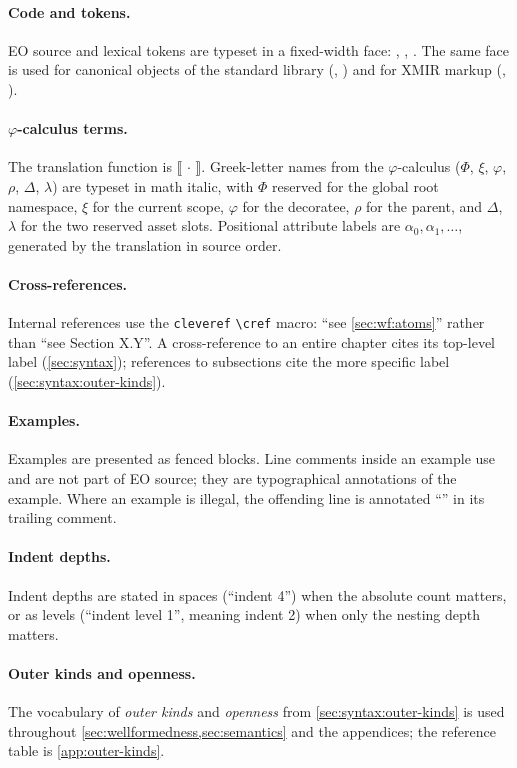 \paragraph{Code and tokens.}
EO source and lexical tokens are typeset in a fixed-width face:
  , , .
The same face is used for canonical objects of the standard library
  (, ) and for XMIR markup
  (, ).

\paragraph{\texorpdfstring{\(\varphi\)-calculus}{phi-calculus} terms.}
The translation function is \(\llbracket\,\cdot\,\rrbracket\).
Greek-letter names from the \(\varphi\)-calculus
  (\(\Phi\), \(\xi\), \(\varphi\), \(\rho\), \(\Delta\), \(\lambda\))
  are typeset in math italic, with \(\Phi\) reserved for the global
  root namespace, \(\xi\) for the current scope, \(\varphi\) for the
  decoratee, \(\rho\) for the parent, and \(\Delta\), \(\lambda\) for
  the two reserved asset slots.
Positional attribute labels are \(\alpha_0, \alpha_1, \ldots\),
  generated by the translation in source order.

\paragraph{Cross-references.}
Internal references use the \texttt{cleveref} \texttt{\textbackslash cref}
  macro: \enquote{see \cref{sec:wf:atoms}} rather than
  \enquote{see Section X.Y}.
A cross-reference to an entire chapter cites its top-level label
  (\cref{sec:syntax}); references to subsections cite the more specific
  label (\cref{sec:syntax:outer-kinds}).

\paragraph{Examples.}
Examples are presented as fenced  blocks.
Line comments inside an example use \ff{//} and are not part of EO
  source; they are typographical annotations of the example.
Where an example is illegal, the offending line is annotated
  \enquote{} in its trailing comment.

\paragraph{Indent depths.}
Indent depths are stated in spaces (\enquote{indent 4}) when the
  absolute count matters, or as levels (\enquote{indent level 1},
  meaning indent 2) when only the nesting depth matters.

\paragraph{Outer kinds and openness.}
The vocabulary of \emph{outer kinds} and \emph{openness} from
  \cref{sec:syntax:outer-kinds} is used throughout
  \cref{sec:wellformedness,sec:semantics} and the appendices;
  the reference table is \cref{app:outer-kinds}.
